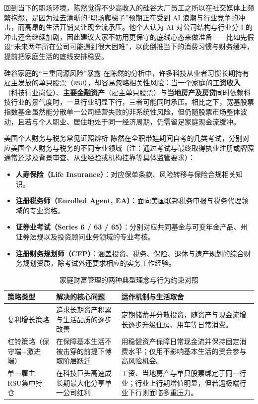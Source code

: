 \documentclass[UTF8,a4paper,11pt,fontset=fandol]{ctexart}
\begin{document}
回到当下的职场环境，陈然觉得不少高收入的硅谷大厂员工之所以在社交媒体上频繁抱怨，是因为过去清晰的“职场爬梯子”预期正在受到 AI 浪潮与行业竞争的冲击，而高昂的生活开销又让现金流承压。他个人认为 AI 对公司结构与行业分工的冲击还会继续加剧，因此建议大家不妨用更保守的底线心态来做准备——比如先假设“未来两年所在公司可能遇到很大困难”，以此倒推当下的消费习惯与财务缓冲，提前把家庭生活的底线安排稳妥。

\begin{importantbox}{硅谷家庭的“三重同源风险”暴露}
在陈然的分析中，许多科技从业者习惯长期持有雇主发放的单只股票（\texttt{RSU}），却容易忽略相关性风险：当一个家庭的\textbf{工资收入}（科技行业岗位）、\textbf{主要金融资产}（雇主单只股票）与\textbf{当地房产及房贷}同时依赖科技行业的景气度时，一旦行业明显下行，三者可能同时承压。相比之下，宽基股票指数基金虽然能分散单一公司经营失败的非系统性风险，但仍随股票市场整体波动，且若与个人职业、居住地处于同一经济周期，仍需留足家庭现金流缓冲。
\end{importantbox}
\begin{knowledgebox}{美国个人财务与税务常见证照辨析}
陈然在全职带娃期间自考的几类考试，分别对应美国个人财务与税务的不同专业领域（注：通过考试与最终取得执业注册或牌照通常还涉及背景审查、从业经验或机构挂靠等具体监管要求）：
\begin{itemize}
\item \textbf{人寿保险（Life Insurance）}：对应保单条款、风险转移与保险合规相关知识。
\item \textbf{注册税务师（Enrolled Agent, EA）}：面向美国联邦税务申报与税务代理领域的专业资格。
\item \textbf{证券业考试（Series 6 / 63 / 65）}：分别对应共同基金与可变年金产品、州证券法规以及投资顾问业务领域的专业考核。
\item \textbf{注册财务规划师（CFP）}：涵盖投资、税务、保险、退休与遗产规划的综合财务规划资质，除考试外还要求相应的实务工作经验。
\end{itemize}
\end{knowledgebox}
\begin{table}[H]\centering\small
\caption{家庭财富管理的两种典型理念与行为约束对照}
\begin{tabular}{>{\raggedright\arraybackslash}p{\dimexpr(\linewidth-6\tabcolsep)/3\relax}>{\raggedright\arraybackslash}p{\dimexpr(\linewidth-6\tabcolsep)/3\relax}>{\raggedright\arraybackslash}p{\dimexpr(\linewidth-6\tabcolsep)/3\relax}}
\toprule
策略类型 & 解决的核心问题 & 运作机制与生活取舍\\\midrule
复利增长策略 & 追求长期资产积累与生活品质的逐步改善 & 定期储蓄并分散投资，随资产与现金流增长逐步升级住房、用车等日常消费。\\[4pt]
杠铃策略（保守端+激进端） & 在保障基本生活不被击穿的前提下博取阶层跃迁 & 用稳健资产保障日常现金流并保持固定消费水平；仅用不影响基本生活的资金参与高风险机会。\\[4pt]
单一雇主RSU集中持仓 & 在科技巨头高速成长期最大化分享单一公司红利 & 工资、当地房产与单只股票绑定于同一行业；行业上行期增值明显，但若遇极端行业下行则面临多重压力。\\[4pt]
\bottomrule\end{tabular}\end{table}
\end{document}
